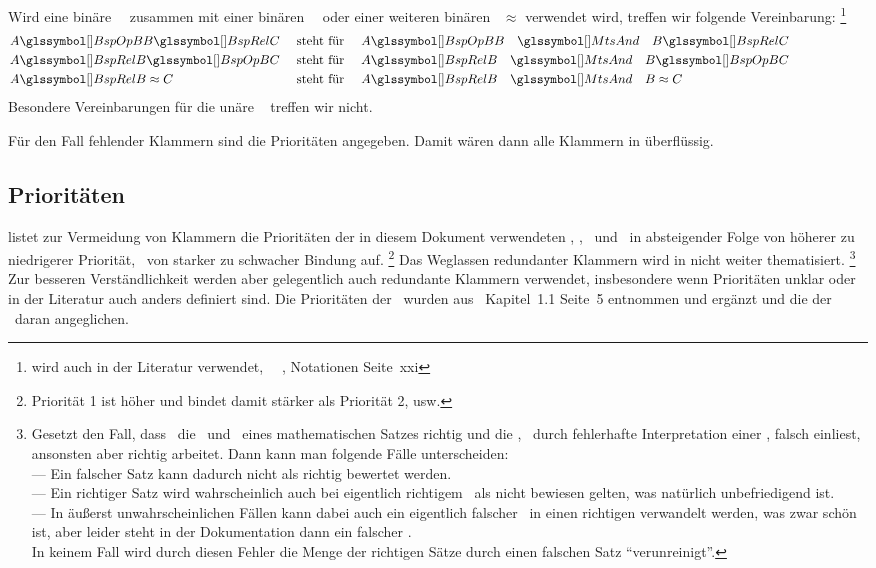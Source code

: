 %
Wird eine binäre \Relation\ \BspRel\ zusammen mit einer binären \Operation\ \BspOpB\ oder einer weiteren binären \Relation\ $\approx$ verwendet wird, treffen wir folgende Vereinbarung:%
\footnote{%
	wird auch in der Literatur verwendet, \textzB\ \textzB~\cite{bib:Rautenberg}, Notationen Seite~xxi
}
\begin{align}
	&   A \BspOpB  B \BspRel C & \text{ steht für }
	&&& A \BspOpB  B \quad \MtsAnd \quad B \BspRel C \\
	&   A \BspRel B \BspOpB  C & \text{ steht für }
	&&& A \BspRel B \quad \MtsAnd \quad B \BspOpB  C \\
	&   A \BspRel B \approx    C & \text{ steht für }
	&&& A \BspRel B \quad \MtsAnd \quad B \approx    C \formulatoleft
\end{align}
Besondere Vereinbarungen für die unäre \Operation\ \chrqt{\BspOpU} treffen wir nicht.

Für den Fall fehlender Klammern sind die Prioritäten  angegeben.
Damit wären dann alle Klammern in  überflüssig.

\subsection{Prioritäten}%
\label {sub-Prioritaeten}

 listet zur Vermeidung von Klammern die Prioritäten der in diesem Dokument verwendeten \Operationen, \Relationen, \Junktoren\ und \Definitionen\ in absteigender Folge von höherer zu niedrigerer Priorität, \textdh\ von starker zu schwacher Bindung auf.%
\footnote{Priorität 1 ist höher und bindet damit stärker als Priorität 2, usw.}
Das Weglassen redundanter Klammern wird in  nicht weiter thematisiert.%
\footnote{%
	Gesetzt den Fall, dass \ASBA\ die \Voraussetzungen\ und \Folgerungen\ eines mathematischen Satzes richtig und die \Beweisschritte, \textzB\ durch fehlerhafte Interpretation einer \Formel, falsch einliest, ansonsten aber richtig arbeitet.
	Dann kann man folgende Fälle unterscheiden:\\
	--- Ein falscher Satz kann dadurch nicht als richtig bewertet werden.\\
	--- Ein richtiger Satz wird wahrscheinlich auch bei eigentlich richtigem \Beweis\ als nicht bewiesen gelten, was natürlich unbefriedigend ist.\\
	--- In äußerst unwahrscheinlichen Fällen kann dabei auch ein eigentlich falscher \Beweis\ in einen richtigen verwandelt werden, was zwar schön ist, aber leider steht in der Dokumentation dann ein falscher \Beweis.\\
	In keinem Fall wird durch diesen Fehler die Menge der richtigen Sätze durch einen falschen Satz "`verunreinigt"'.
}
Zur besseren Verständlichkeit werden aber gelegentlich auch redundante Klammern verwendet, insbesondere wenn Prioritäten unklar oder in der Literatur auch anders definiert sind.
Die Prioritäten der \Junktoren\ wurden aus~\cite{bib:Rautenberg} Kapitel~1.1 Seite~5 entnommen und ergänzt und die der \Metaoperationen\ daran angeglichen.

